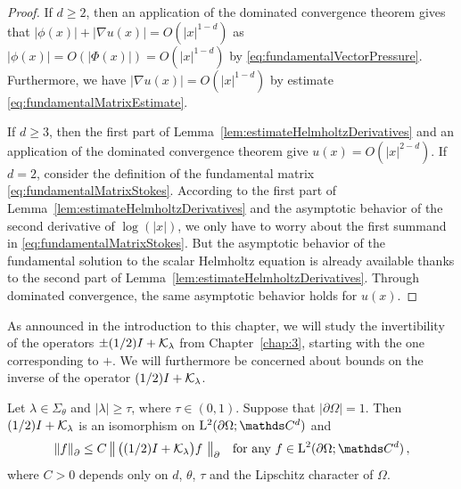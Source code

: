 \begin{proof}
  If $d \geq 2$, then an application of the dominated convergence theorem gives that $|\phi(x)| + |\nabla u(x)| = O(|x|^{1 - d})$ as $|\phi(x)| = O(|\Phi(x)|) = O(|x|^{1 - d})$ by \eqref{eq:fundamentalVectorPressure}.
 Furthermore, we have $|\nabla u(x)| = O(|x|^{1 - d})$ by estimate \eqref{eq:fundamentalMatrixEstimate}.

  If $d \geq 3$, then the first part of Lemma~\ref{lem:estimateHelmholtzDerivatives} and an application of the dominated convergence theorem give $u(x) = O(|x|^{2 - d})$.
  If $d = 2$, consider the definition of the fundamental matrix \eqref{eq:fundamentalMatrixStokes}. According to the first part of Lemma~\ref{lem:estimateHelmholtzDerivatives} and the asymptotic behavior of the second derivative of $\log(|x|)$, we only have to worry about the first summand in \eqref{eq:fundamentalMatrixStokes}. 
  But the asymptotic behavior of the fundamental solution to the scalar Helmholtz equation is already available thanks to the second part of Lemma~\ref{lem:estimateHelmholtzDerivatives}. 
  Through dominated convergence, the same asymptotic behavior holds for $u(x)$.
\end{proof}

As announced in the introduction to this chapter, we will study the invertibility of the operators $\pm(1/2) I + \mathcal{K}_\lambda$ from Chapter~\ref{chap:3}, starting with the one corresponding to $+$.
We will furthermore be concerned about bounds on the inverse of the operator $(1/2) I + \mathcal{K}_\lambda$.

\begin{lem}
  \label{lem:inverseEstimate1}
  Let $\lambda \in \Sigma_\theta$ and $|\lambda| \geq \tau$, where $\tau \in (0,1)$.
  Suppose that $|\partial\Omega| = 1$.
  Then $(1/2)I + \mathcal{K}_\lambda$ is an isomorphism on $\Ell^2(\partial\Omega; \C^d)$ and
  \begin{align}
    \label{eq:inverseEstimate}
    \| f\|^{}_\partial \leq C \, \big\|\, \big( (1/2) I + \K_\lambda \big) f\, \, \big\|^{}_\partial \quad\text{for any } f \in \Ell^2(\partial\Omega; \C^d)\,,
  \end{align}
  where $C > 0$ depends only on $d$, $\theta$, $\tau$ and the Lipschitz character of $\Omega$.
\end{lem}

